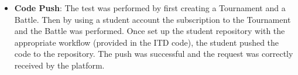 \begin{itemize}
    \item \textbf{Code Push}: The test was performed by first creating a Tournament and a Battle. Then by using a student account the subscription to the Tournament and the Battle was performed. Once set up the student repository with the appropriate workflow (provided in the ITD code), the student pushed the code to the repository. The push was successful and the request was correctly received by the platform.
\end{itemize}